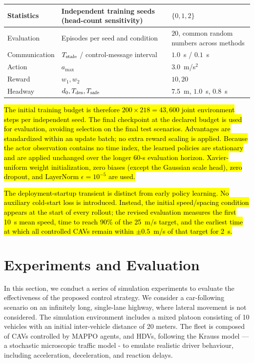 \documentclass{ieeeaccess}
\begin{document}
\begin{table}[htbp]
\begin{tabular}{|l|l|l|}
\rowcolor{yellow}Statistics & Independent training seeds (head-count sensitivity) & $\{0,1,2\}$ \\ \hline %
\rowcolor{yellow}Evaluation & Episodes per seed and condition & $20$, common random numbers across methods \\ \hline %
\rowcolor{yellow}Communication & $T_{\rm stale}$ / control-message interval & $1.0$~s / $0.1$~s \\ \hline %
\rowcolor{yellow}Action & $a_{\max}$ & $3.0$~m/s$^2$ \\ \hline %
\rowcolor{yellow}Reward & $w_1,w_2$ & $10,20$ \\ \hline %
\rowcolor{yellow}Headway & $d_0,T_{\rm des},T_{\rm safe}$ & $7.5$~m, $1.0$~s, $0.8$~s \\ \hline %
\end{tabular}
\end{table}

\hl{The initial training budget is therefore $200\times218=43{,}600$ joint environment steps per independent seed. The final checkpoint at the declared budget is used for evaluation, avoiding selection on the final test scenarios. Advantages are standardized within an update batch; no extra reward scaling is applied. Because the actor observation contains no time index, the learned policies are stationary and are applied unchanged over the longer 60-s evaluation horizon. Xavier-uniform weight initialization, zero biases (except the Gaussian scale head), zero dropout, and LayerNorm $\epsilon=10^{-5}$ are used.} %

\hl{The deployment-startup transient is distinct from early policy learning. No auxiliary cold-start loss is introduced. Instead, the initial speed/spacing condition appears at the start of every rollout; the revised evaluation measures the first 10~s mean speed, time to reach 90\% of the 25~m/s target, and the earliest time at which all controlled CAVs remain within $\pm0.5$~m/s of that target for 2~s.} %

\section{Experiments and Evaluation}
\label{sec:exp_scenario}
In this section, we conduct a series of simulation experiments to evaluate the effectiveness of the proposed control strategy. We consider a car-following scenario on an infinitely long, single-lane highway, where lateral movement is not considered. The simulation environment includes a mixed platoon consisting of 10 vehicles with an initial inter-vehicle distance of 20 meters. The fleet is composed of CAVs controlled by MAPPO agents, and HDVs, following the Krauss model —a stochastic microscopic traffic model - to emulate realistic driver behaviour, including acceleration, deceleration, and reaction delays.
\end{document}

